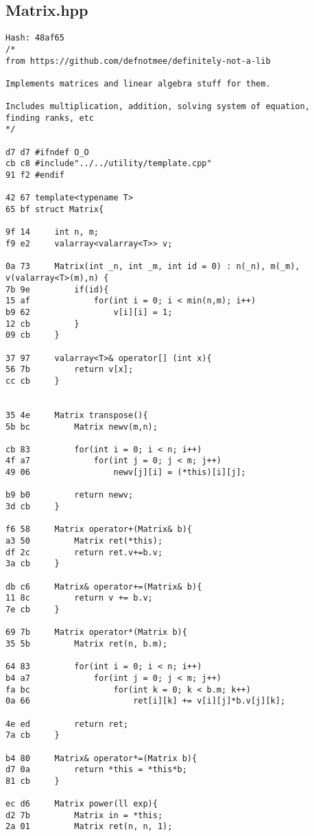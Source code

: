 \documentclass[11pt, a4paper, twoside]{article}
\begin{document}
\subsection{Matrix.hpp}
\begin{lstlisting}
Hash: 48af65
/*
from https://github.com/defnotmee/definitely-not-a-lib

Implements matrices and linear algebra stuff for them.

Includes multiplication, addition, solving system of equation,
finding ranks, etc
*/

d7 d7 #ifndef O_O
cb c8 #include"../../utility/template.cpp"
91 f2 #endif

42 67 template<typename T>
65 bf struct Matrix{
      
9f 14     int n, m;
f9 e2     valarray<valarray<T>> v;
      
0a 73     Matrix(int _n, int _m, int id = 0) : n(_n), m(_m), v(valarray<T>(m),n) {
7b 9e         if(id){
15 af             for(int i = 0; i < min(n,m); i++)
b9 62                 v[i][i] = 1;
12 cb         }
09 cb     }
      
37 97     valarray<T>& operator[] (int x){
56 7b         return v[x];
cc cb     }
      
      
35 4e     Matrix transpose(){
5b bc         Matrix newv(m,n);
      
cb 83         for(int i = 0; i < n; i++)
4f a7             for(int j = 0; j < m; j++)
49 06                 newv[j][i] = (*this)[i][j];
              
b9 b0         return newv;
3d cb     }
          
f6 58     Matrix operator+(Matrix& b){
a3 50         Matrix ret(*this);
df 2c         return ret.v+=b.v;
3a cb     }
      
db c6     Matrix& operator+=(Matrix& b){
11 8c         return v += b.v;
7e cb     }
      
69 7b     Matrix operator*(Matrix b){
35 5b         Matrix ret(n, b.m);
      
64 83         for(int i = 0; i < n; i++)
b4 a7             for(int j = 0; j < m; j++)
fa bc                 for(int k = 0; k < b.m; k++)
0a 66                     ret[i][k] += v[i][j]*b.v[j][k];
              
4e ed         return ret;
7a cb     }
      
b4 80     Matrix& operator*=(Matrix b){
d7 0a         return *this = *this*b;
81 cb     }
      
ec d6     Matrix power(ll exp){
d2 7b         Matrix in = *this;
2a 01         Matrix ret(n, n, 1);
      

\end{lstlisting}
\end{document}
